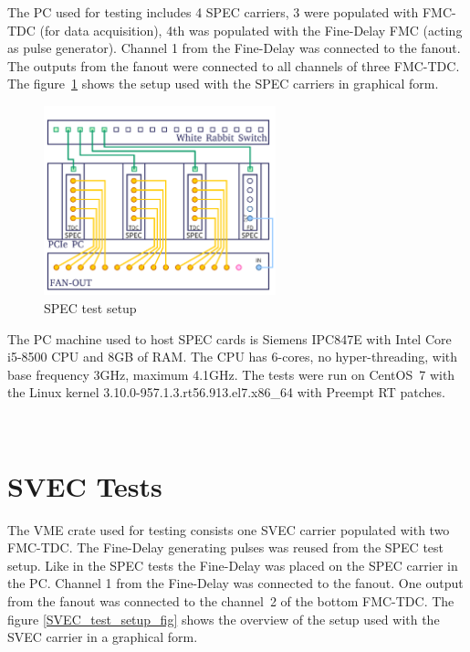 \documentclass[a4paper, 12pt]{article}
\begin{document}
The PC used for testing includes 4 SPEC carriers, 3 were populated with
FMC-TDC (for data acquisition), 4th was populated with the Fine-Delay FMC
(acting as pulse generator).
Channel 1 from the Fine-Delay was connected to the fanout.
The outputs from the fanout were connected to all channels of three FMC-TDC.
The figure~\ref{SPEC_test_setup_fig} shows the setup used with the SPEC carriers
in graphical form.

\begin{figure}[ht!]
  \centering
  \includegraphics[width=0.6\textwidth]{img/TDC-setup_SPEC.png}
  \caption{SPEC test setup}
  \label{SPEC_test_setup_fig}
\end{figure}

The PC machine used to host SPEC cards is Siemens IPC847E with
Intel Core i5-8500\cite{spec.cpu} CPU and 8GB of RAM.
The CPU has 6-cores, no hyper-threading, with base frequency 3GHz,
maximum 4.1GHz.
The tests were run on CentOS~7 with the Linux kernel
3.10.0-957.1.3.rt56.913.el7.x86\_64 with Preempt RT patches.

~

\FloatBarrier

\section{SVEC Tests}
\label{svec_tests}

The VME crate used for testing consists one SVEC carrier populated with two
FMC-TDC. The Fine-Delay generating pulses was reused from the SPEC test setup.
Like in the SPEC tests the Fine-Delay was placed on the SPEC carrier in the PC.
Channel 1 from the Fine-Delay was connected to the fanout. One output from
the fanout was connected to the channel~2 of the bottom FMC-TDC.
The figure \ref{SVEC_test_setup_fig} shows the overview of
the setup used with the SVEC carrier in a graphical form.
\end{document}
